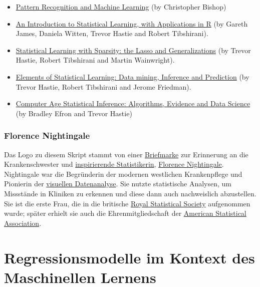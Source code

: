 \documentclass[
  ngerman,
]{book}
\begin{document}
\begin{itemize}
\item
  \href{https://www.microsoft.com/en-us/research/uploads/prod/2006/01/Bishop-Pattern-Recognition-and-Machine-Learning-2006.pdf}{Pattern Recognition and Machine Learning} (by Christopher Bishop)
\item
  \href{https://trevorhastie.github.io/ISLR/}{An Introduction to Statistical Learning, with Applications in R} (by Gareth James, Daniela Witten, Trevor Hastie and Robert Tibshirani).
\item
  \href{https://web.stanford.edu/~hastie/StatLearnSparsity/}{Statistical Learning with Sparsity: the Lasso and Generalizations} (by Trevor Hastie, Robert Tibshirani and Martin Wainwright).
\item
  \href{https://web.stanford.edu/~hastie/ElemStatLearn/}{Elements of Statistical Learning: Data mining, Inference and Prediction} (by Trevor Hastie, Robert Tibshirani and Jerome Friedman).
\item
  \href{https://web.stanford.edu/~hastie/CASI/}{Computer Age Statistical Inference: Algorithms, Evidence and Data Science} (by Bradley Efron and Trevor Hastie)
\end{itemize}

\hypertarget{florence-nightingale}{%
\subsection*{Florence Nightingale}\label{florence-nightingale}}

Das Logo zu diesem Skript stammt von einer \href{https://de.wikipedia.org/wiki/Datei:DBP_1955_225_Florence_Nightingale.jpg}{Briefmarke} zur Erinnerung an die Krankenschwester und \href{https://infowetrust.com/project/designhero}{inspirierende Statistikerin}, \href{https://de.wikipedia.org/wiki/Florence_Nightingale}{Florence Nightingale}. Nightingale war die Begründerin der modernen westlichen Krankenpflege und Pionierin der \href{https://de.wikipedia.org/wiki/Kreisdiagramm\#/media/Datei:Nightingale-mortality.jpg}{visuellen Datenanalyse}. Sie nutzte statistische Analysen, um Missstände in Kliniken zu erkennen und diese dann auch nachweislich abzustellen. Sie ist die erste Frau, die in die britische \href{https://rss.org.uk/}{Royal Statistical Society} aufgenommen wurde; später erhielt sie auch die Ehrenmitgliedschaft der \href{https://www.amstat.org/}{American Statistical Association}.

\hypertarget{ch:RegML}{%
\chapter{Regressionsmodelle im Kontext des Maschinellen Lernens}\label{ch:RegML}}
\end{document}
